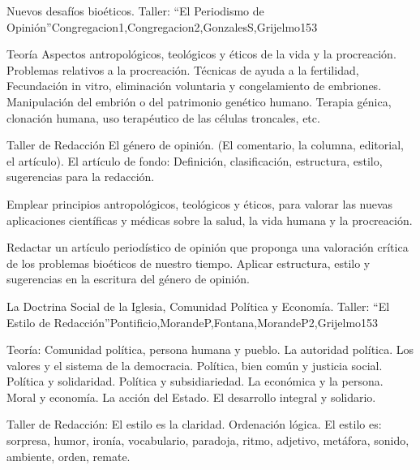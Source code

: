 \begin{syllabus}
\begin{unit}{Nuevos desafíos bioéticos. Taller: ``El Periodismo de Opinión''}{Congregacion1,Congregacion2,GonzalesS,Grijelmo}{15}{3}
\begin{topics}
	\item Teoría
 		\subitem Aspectos antropológicos, teológicos y éticos de la vida y la procreación. 
 		\subitem Problemas relativos a la procreación. Técnicas de ayuda a la fertilidad, Fecundación in vitro, eliminación voluntaria y congelamiento de embriones.
 		\subitem Manipulación del embrión o del patrimonio genético humano. Terapia génica, clonación humana, uso terapéutico de las células troncales, etc.
	\item Taller de Redacción
 		\subitem El género de opinión. (El comentario, la columna, editorial, el artículo).
 		\subitem El artículo de fondo: Definición, clasificación, estructura, estilo, sugerencias para la redacción.
\end{topics}
\begin{learningoutcomes}
	\item Emplear principios antropológicos, teológicos y éticos, para valorar las nuevas aplicaciones científicas y médicas sobre la salud, la vida humana y la procreación.
	\item Redactar un artículo periodístico de opinión que proponga una valoración crítica de los problemas bioéticos de nuestro tiempo. Aplicar estructura, estilo y sugerencias en la escritura del género de opinión.
\end{learningoutcomes}
\end{unit}

\begin{unit}{La Doctrina Social de la Iglesia, Comunidad Política y Economía. Taller: ``El Estilo de Redacción''}{Pontificio,MorandeP,Fontana,MorandeP2,Grijelmo}{15}{3}
\begin{topics}
	\item Teoría:
 		\subitem Comunidad política, persona humana y pueblo. La autoridad política. Los valores y el sistema de la democracia. Política, bien común y justicia social. Política y solidaridad. Política y subsidiariedad.
 		\subitem La económica y la persona. Moral y economía. La acción del Estado. El desarrollo integral y solidario.
	\item Taller de Redacción:
 		\subitem El estilo es la claridad. Ordenación lógica. El estilo es: sorpresa, humor, ironía, vocabulario, paradoja, ritmo, adjetivo, metáfora, sonido, ambiente, orden, remate.


\end{topics}
\end{unit}
\end{syllabus}
